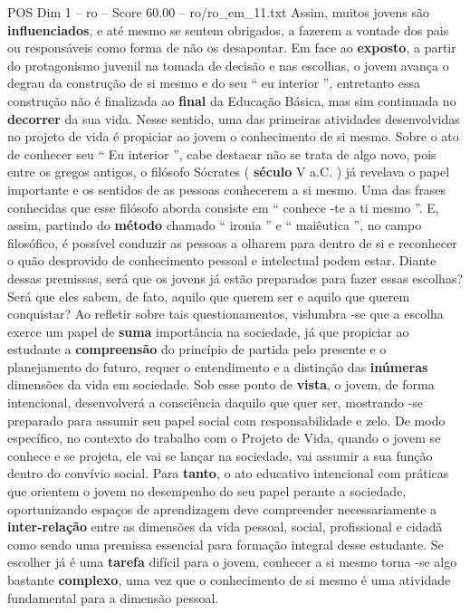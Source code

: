 \begin{textsample}{POS Dim 1 – ro – Score 60.00 – ro/ro\_em\_11.txt}
Assim, muitos jovens são \textbf{influenciados}, e até mesmo se sentem obrigados, a fazerem a vontade dos pais ou responsáveis como forma de não os desapontar.
Em face ao \textbf{exposto}, a partir do protagonismo juvenil na tomada de decisão e nas escolhas, o jovem avança o degrau da construção de si mesmo e do seu “ eu interior ”, entretanto essa construção não é finalizada ao \textbf{final} da Educação Básica, mas sim continuada no \textbf{decorrer} da sua vida.
Nesse sentido, uma das primeiras atividades desenvolvidas no projeto de vida é propiciar ao jovem o conhecimento de si mesmo.
Sobre o ato de conhecer seu “ Eu interior ”, cabe destacar não se trata de algo novo, pois entre os gregos antigos, o filósofo Sócrates ( \textbf{século} V a.C. ) já revelava o papel importante e os sentidos de as pessoas conhecerem a si mesmo.
Uma das frases conhecidas que esse filósofo aborda consiste em “ conhece -te a ti mesmo ”.
E, assim, partindo do \textbf{método} chamado “ ironia ” e “ maiêutica ”, no campo filosófico, é possível conduzir as pessoas a olharem para dentro de si e reconhecer o quão desprovido de conhecimento pessoal e intelectual podem estar.
Diante dessas premissas, será que os jovens já estão preparados para fazer essas escolhas?
Será que eles sabem, de fato, aquilo que querem ser e aquilo que querem conquistar?
Ao refletir sobre tais questionamentos, vislumbra -se que a escolha exerce um papel de \textbf{suma} importância na sociedade, já que propiciar ao estudante a \textbf{compreensão} do princípio de partida pelo presente e o planejamento do futuro, requer o entendimento e a distinção das \textbf{inúmeras} dimensões da vida em sociedade.
Sob esse ponto de \textbf{vista}, o jovem, de forma intencional, desenvolverá a consciência daquilo que quer ser, mostrando -se preparado para assumir seu papel social com responsabilidade e zelo.
De modo específico, no contexto do trabalho com o Projeto de Vida, quando o jovem se conhece e se projeta, ele vai se lançar na sociedade, vai assumir a sua função dentro do convívio social.
Para \textbf{tanto}, o ato educativo intencional com práticas que orientem o jovem no desempenho do seu papel perante a sociedade, oportunizando espaços de aprendizagem deve compreender necessariamente a \textbf{inter-relação} entre as dimensões da vida pessoal, social, profissional e cidadã como sendo uma premissa essencial para formação integral desse estudante.
Se escolher já é uma \textbf{tarefa} difícil para o jovem, conhecer a si mesmo torna -se algo bastante \textbf{complexo}, uma vez que o conhecimento de si mesmo é uma atividade fundamental para a dimensão pessoal.

\end{textsample}
